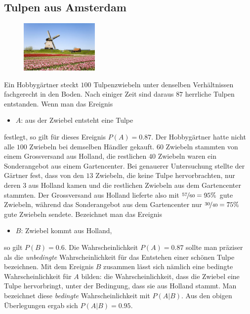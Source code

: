 \documentclass[%
<<<<<<< Updated upstream
<<<<<<< Updated upstream
11pt,%
twoside,%
titlepage,%
german,%
=======
=======
>>>>>>> Stashed changes
11pt,%
twoside,%
titlepage,%
swissgerman,%
<<<<<<< Updated upstream
>>>>>>> Stashed changes
=======
>>>>>>> Stashed changes
headsepline%
]{scrartcl}
\theoremstyle{definition}
\theoremstyle{plain}
\begin{document}
\subsection{Tulpen aus Amsterdam}

\begin{figure}
  \begin{center}
    \includegraphics[width=0.34\textwidth]{pictures/tulpen}
  \end{center}
\end{figure}
Ein Hobbygärtner steckt $100$ Tulpenzwiebeln unter denselben Verhältnissen fachgerecht in den Boden. Nach einiger Zeit sind daraus $87$ herrliche Tulpen entstanden. Wenn man das Ereignis
\begin{itemize}
    \item[] $A$: aus der Zwiebel entsteht eine Tulpe
\end{itemize}
festlegt, so gilt für dieses Ereignis $P(A)=0.87$.
Der Hobbygärtner hatte nicht alle $100$ Zwiebeln bei demselben Händler gekauft. $60$ Zwiebeln stammten von einem Grossversand aus Holland, die restlichen $40$ Zwiebeln waren ein Sonderangebot aus einem Gartencenter. Bei genauerer Untersuchung stellte der Gärtner fest, dass von den $13$ Zwiebeln, die keine Tulpe hervorbrachten, nur deren $3$ aus Holland kamen und die restlichen Zwiebeln aus dem Gartencenter stammten. Der Grossversand aus Holland lieferte also mit $\nicefrac{57}{60}=95\%$ gute Zwiebeln, während das Sonderangebot aus dem Gartencenter nur $\nicefrac{30}{40}=75\%$ gute Zwiebeln sendete. Bezeichnet man das Ereignis
\begin{itemize}
    \item[] $B$: Zwiebel kommt aus Holland,
\end{itemize}
so gilt $P(B)=0.6$.
Die Wahrscheinlichkeit $P(A)=0.87$ sollte man präziser als die \emph{unbedingte} Wahrscheinlichkeit für das Entstehen einer schönen Tulpe bezeichnen. Mit dem Ereignis $B$ zusammen lässt sich nämlich eine bedingte Wahrscheinlichkeit für $A$ bilden: die Wahrscheinlichkeit, dass die Zwiebel eine Tulpe hervorbringt, unter der Bedingung, dass sie aus Holland stammt. Man bezeichnet diese \emph{bedingte} Wahrscheinlichkeit mit $P(A|B)$.
Aus den obigen Überlegungen ergab sich $P(A|B)=0.95$.
\end{document}
